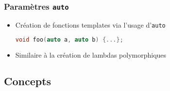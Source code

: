 \documentclass[C++.tex]{subfiles}
\begin{document}
\begin{frame}[fragile]
	\frametitle{Paramètres \lstinline|auto|}
	\begin{itemize}
		\item Création de fonctions templates via l'usage d'\lstinline|auto|

		\begin{lstlisting}[language=C++]
void foo(auto a, auto b) {...};\end{lstlisting}

		\item Similaire	à la création de lambdas polymorphiques
	\end{itemize}
\end{frame}

\subsection*{Concepts}
\end{document}

